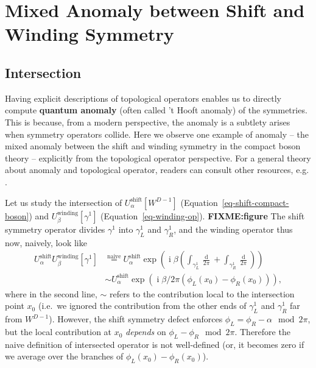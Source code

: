 \documentclass[
  letterpaper,
  DIV=11,
  numbers=noendperiod]{scrreport}
\DeclareMathOperator{\imunit}{i}
\newcommand{\stdim}{D}
\begin{document}
\hypertarget{mixed-anomaly-between-shift-and-winding-symmetry}{%
\section{Mixed Anomaly between Shift and Winding
Symmetry}\label{mixed-anomaly-between-shift-and-winding-symmetry}}

\hypertarget{intersection}{%
\subsection{Intersection}\label{intersection}}

Having explicit descriptions of topological operators enables us to
directly compute \textbf{quantum anomaly} (often called 't Hooft
anomaly) of the symmetries. This is because, from a modern perspective,
the anomaly is a subtlety arises when symmetry operators collide. Here
we observe one example of anomaly -- the mixed anomaly between the shift
and winding symmetry in the compact boson theory -- explicitly from the
topological operator perspective. For a general theory about anomaly and
topological operator, readers can consult other resources, e.g.
\textcite{TachikawaTasi}.

Let us study the intersection of \(U_\alpha^\text{shift}[W^{\stdim-1}]\)
(Equation~\ref{eq-shift-compact-boson}) and
\(U_\beta^\text{winding}[\gamma^1]\) (Equation~\ref{eq-winding-op}).
\textbf{FIXME:figure} The shift symmetry operator divides \(\gamma^1\)
into \(\gamma^1_L\) and \(\gamma^1_R\), and the winding operator thus
now, naively, look like \[
\begin{aligned}
U^\text{shift}_\alpha U^\text{winding}_\beta[\gamma^1] &\stackrel{\text{naive}}{=} U^\text{shift}_\alpha \exp\left(\imunit\beta \left(\int_{\gamma^1_L}\frac{\mathop{d\phi_L}}{2\pi} + \int_{\gamma^1_R}\frac{\mathop{d\phi_R}}{2\pi}\right)\right)\\
& \sim U^\text{shift}_\alpha \exp\left(\imunit\beta/2\pi (\phi_L(x_0) - \phi_R(x_0)) \right),
\end{aligned}
\] where in the second line, \(\sim\) refers to the contribution local
to the intersection point \(x_0\) (i.e.~we ignored the contribution from
the other ends of \(\gamma^1_L\) and \(\gamma^1_R\) far from
\(W^{\stdim-1}\)). However, the shift symmetry defect enforces
\(\phi_L = \phi_R - \alpha \mod 2\pi\), but the local contribution at
\(x_0\) \emph{depends} on \(\phi_L-\phi_R \mod 2\pi\). Therefore the
naive definition of intersected operator is not well-defined (or, it
becomes zero if we average over the branches of
\(\phi_L(x_0) -\phi_R(x_0)\)).
\end{document}

